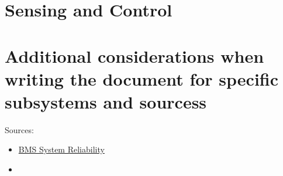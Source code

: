 \section{Sensing and Control}


\section{Additional considerations when writing the document for specific subsystems and sourcess}
Sources:
\begin{itemize}
    \item \href{https://link.springer.com/article/10.1007/s40789-022-00494-0}{BMS System Reliability}
    \item 
\end{itemize}


\begin{comment}





\end{comment}

\newpage